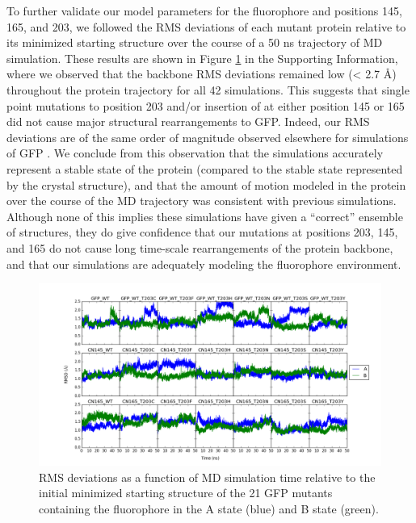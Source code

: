 To further validate our model parameters for the fluorophore and positions 145, 165, and 203, we followed the RMS deviations of each mutant protein relative to its minimized starting structure over the course of a 50 \si{\ns} trajectory of MD simulation.
These results are shown in Figure \ref{fig:rmsd} in the Supporting Information, where we observed that the backbone RMS deviations remained low (< 2.7 \si{\angstrom}) throughout the protein trajectory for all 42 simulations.
This suggests that single point mutations to position 203 and/or insertion of \pCNF{} at either position 145 or 165 did not cause major structural rearrangements to GFP.
Indeed, our RMS deviations are of the same order of magnitude observed elsewhere for simulations of GFP \cite{Nifosi2003, Reuter2002}.
We conclude from this observation that the simulations accurately represent a stable state of the protein (compared to the stable state represented by the crystal structure), and that the amount of motion modeled in the protein over the course of the MD trajectory was consistent with previous simulations.
Although none of this implies these simulations have given a ``correct'' ensemble of structures, they do give confidence that our mutations at positions 203, 145, and 165 do not cause long time-scale rearrangements of the protein backbone, and that our simulations are adequately modeling the fluorophore environment. 

\begin{figure}
    \center
    \includegraphics[width=\double]{figures-gfp-pKa/combined_rmsd.png}
    \caption{
       RMS deviations as a function of MD simulation time relative to the initial minimized starting structure of the 21 GFP mutants containing the fluorophore in the A state (blue) and B state (green).
   }
    \label{fig:rmsd}
\end{figure}

